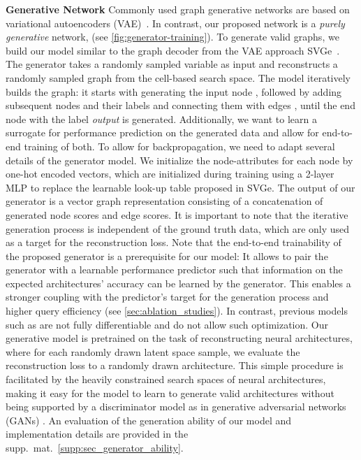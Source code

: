 \documentclass[runningheads]{llncs}
\begin{document}
\noindent \textbf{Generative Network}
Commonly used graph generative networks are based on variational  autoencoders (VAE)~\cite{2014VAE}.
In contrast, our proposed network is a \emph{purely generative} network,  (see \autoref{fig:generator-training}).
To generate valid graphs, we build our model similar to the graph decoder from the VAE approach SVGe~\cite{2021SVGe}. The generator takes a randomly sampled variable  as input and reconstructs a randomly sampled graph from the cell-based search space. The model iteratively builds the graph: it starts with generating the input node , followed by adding subsequent nodes  and their labels and connecting them with edges , until the end node  with the label \textit{output} is generated. Additionally, we want to learn a surrogate for performance prediction on the generated data and allow for end-to-end training of both. 
To allow for backpropagation, we need to adapt several details of the generator model. We initialize the node-attributes for each node by one-hot encoded vectors, which are initialized during training using a 2-layer MLP to replace the learnable look-up table proposed in SVGe. The output of our generator is a vector graph representation consisting of a concatenation of generated node scores and edge scores. It is important to note that the iterative generation process is independent of the ground truth data, which are only used as a target for the reconstruction loss. Note that the end-to-end trainability of the proposed generator is a prerequisite for our model: It allows to pair the generator with a learnable performance predictor such that information on the expected architectures' accuracy can be learned by the generator. This enables a stronger coupling with the predictor's target for the generation process and higher query efficiency (see \autoref{sec:ablation_studies}). In contrast, previous models such as \cite{2021SGNAS,2021SVGe,2020Arch2vec} are not fully differentiable and do not allow such optimization.
Our generative model is pretrained on the task of reconstructing neural architectures, where for each randomly drawn latent space sample, we evaluate the reconstruction loss to a randomly drawn architecture.
This simple procedure is facilitated by the heavily constrained search spaces of neural architectures, making it easy for the model to learn to generate valid architectures without being supported by a discriminator model as in generative adversarial networks (GANs) \cite{2014GAN}. An evaluation of the generation ability of our model and implementation details are provided in the supp.~mat.~\autoref{supp:sec_generator_ability}.
\end{document}

